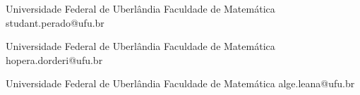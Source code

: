 \documentclass[10pt]{article}
\begin{document}
\cabecalho
%
% 
%   
%
%
%
%
%    
\begin{autoria}{3}

{Universidade Federal de Uberlândia}
{Faculdade de Matemática}
{studant.perado@ufu.br}

{Universidade Federal de Uberlândia}
{Faculdade de Matemática}
{hopera.dorderi@ufu.br}

{Universidade Federal de Uberlândia}
{Faculdade de Matemática}
{alge.leana@ufu.br}

\end{autoria}
\end{document}
